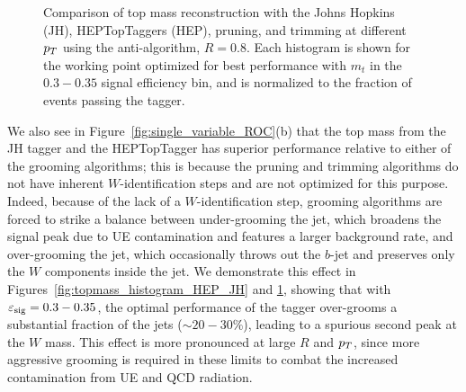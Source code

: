 \begin{figure}
\caption{Comparison of top mass reconstruction with the Johns Hopkins (JH), HEPTopTaggers (HEP), pruning, and trimming at different $p_T$ using the anti-\kT algorithm, $R=0.8$. Each histogram is shown for the working point optimized for best performance with $m_t$ in the $0.3-0.35$ signal efficiency bin, and is normalized to the fraction of events passing the tagger.}
\label{fig:topmass_histogram_HEP_JH_pT}
\end{figure}

We also see in Figure~\ref{fig:single_variable_ROC}(b) that the top mass from the JH tagger and the HEPTopTagger has superior performance relative to either of the grooming algorithms; this is because  the pruning and trimming algorithms do not have inherent $W$-identification steps and are not optimized for this purpose. Indeed, because of the lack of a $W$-identification step, grooming algorithms are forced to strike a balance between under-grooming the jet, which broadens the signal peak due to UE contamination and features a larger background rate, and over-grooming the jet, which occasionally throws out the $b$-jet and preserves only the $W$ components inside the jet. We demonstrate this effect in Figures~\ref{fig:topmass_histogram_HEP_JH} and \ref{fig:topmass_histogram_HEP_JH_pT}, showing that with $\varepsilon_{\rm sig}=0.3-0.35$, the optimal performance of the tagger over-grooms a substantial fraction of the jets ($\sim20-30\%$), leading to a spurious second peak at the $W$ mass. This effect is more pronounced at large $R$ and $p_T$, since more aggressive grooming is required in these limits to combat the increased contamination from UE and QCD radiation.

